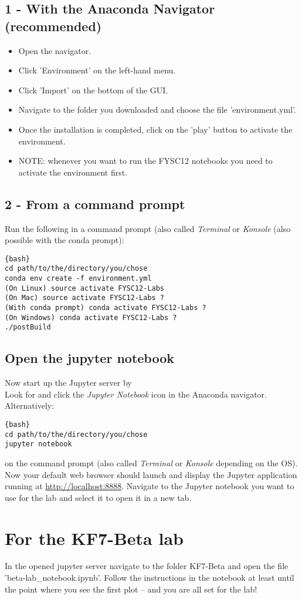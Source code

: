 \documentclass[a4,11pt, notitlepage]{article}
\begin{document}
\newpage
\subsection*{1 - With the Anaconda Navigator (recommended)}
\begin{itemize}
  \item Open the navigator.
  \item Click 'Environment' on the left-hand menu.
  \item Click 'Import' on the bottom of the GUI.
  \item Navigate to the folder you downloaded and choose the file 'environment.yml'.
  \item Once the installation is completed, click on the 'play' button to activate the environment.
  \item NOTE: whenever you want to run the FYSC12 notebooks you need to activate the environment first.
\end{itemize}

\subsection*{2 - From a command prompt}

Run the following in a command prompt (also called \emph{Terminal} or \emph{Konsole} (also possible with the conda prompt):

\begin{lstlisting}{bash}
cd path/to/the/directory/you/chose
conda env create -f environment.yml
(On Linux) source activate FYSC12-Labs
(On Mac) source activate FYSC12-Labs ?
(With conda prompt) conda activate FYSC12-Labs ?
(On Windows) conda activate FYSC12-Labs ?
./postBuild
\end{lstlisting}


\subsection*{Open the jupyter notebook}
Now start up the Jupyter server by \\


Look for and click the \emph{Jupyter Notebook} icon in the Anaconda navigator. \\


Alternatively:
\begin{lstlisting}{bash}
cd path/to/the/directory/you/chose
jupyter notebook
\end{lstlisting}
on the command prompt (also called \emph{Terminal} or \emph{Konsole}
depending on the OS). \\

Now your default web browser should launch and display the Jupyter application
running at \url{http://localhost:8888}. Navigate to the Jupyter notebook you
want to use for the lab and select it to open it in a new tab.

\section*{For the KF7-Beta lab}
In the opened jupyter server navigate to the folder KF7-Beta and open the file 'beta-lab\_notebook.ipynb'.
Follow the instructions in the notebook at least until the point where you see the first plot -- and you are all set for the lab!
\end{document}
